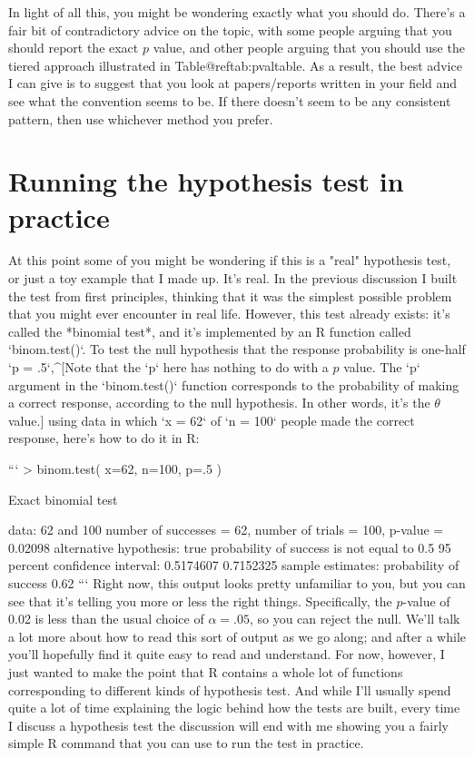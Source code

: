In light of all this, you might be wondering exactly what you should do. There's a fair bit of contradictory advice on the topic, with some people arguing that you should report the exact $p$ value, and other people arguing that you should use the tiered approach illustrated in Table@reftab:pvaltable. As a result, the best advice I can give is to suggest that you look at papers/reports written in your field and see what the convention seems to be. If there doesn't seem to be any consistent pattern, then use whichever method you prefer. 

\section{Running the hypothesis test in practice}

At this point some of you might be wondering if this is a "real" hypothesis test, or just a toy example that I made up. It's real. In the previous discussion I built the test from first principles, thinking that it was the simplest possible problem that you might ever encounter in real life. However, this test already exists: it's called the *binomial test*, and it's implemented by an R function called `binom.test()`. To test the null hypothesis that the response probability is one-half `p = .5`,^[Note that the `p` here has nothing to do with a $p$ value. The `p` argument in the `binom.test()` function corresponds to the probability of making a correct response, according to the null hypothesis. In other words, it's the $\theta$ value.] using data in which `x = 62` of `n = 100` people made the correct response, here's how to do it in R:

```
> binom.test( x=62, n=100, p=.5 )

	Exact binomial test

data:  62 and 100 
number of successes = 62, number of trials = 100,
p-value = 0.02098
alternative hypothesis: true probability of success is not equal to 0.5 
95 percent confidence interval:
 0.5174607 0.7152325 
sample estimates:
probability of success 
                  0.62 
```
Right now, this output looks pretty unfamiliar to you, but you can see that it's telling you more or less the right things. Specifically, the $p$-value of 0.02 is less than the usual choice of $\alpha = .05$, so you can reject the null. We'll talk a lot more about how to read this sort of output as we go along; and after a while you'll hopefully find it quite easy to read and understand. For now, however, I just wanted to make the point that R contains a whole lot of functions corresponding to different kinds of hypothesis test. And while I'll usually spend quite a lot of time explaining the logic behind how the tests are built, every time I discuss a hypothesis test the discussion will end with me showing you a fairly simple R command that you can use to run the test in practice.

